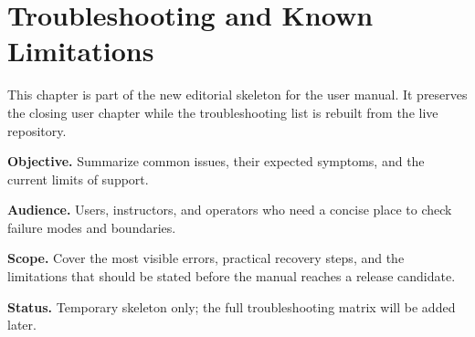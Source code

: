 \chapter{Troubleshooting and Known Limitations}
\label{chap:troubleshooting-and-known-limitations}

This chapter is part of the new editorial skeleton for the user manual. It preserves the closing user chapter while the troubleshooting list is rebuilt from the live repository.

\noindent\textbf{Objective.} Summarize common issues, their expected symptoms, and the current limits of support.

\noindent\textbf{Audience.} Users, instructors, and operators who need a concise place to check failure modes and boundaries.

\noindent\textbf{Scope.} Cover the most visible errors, practical recovery steps, and the limitations that should be stated before the manual reaches a release candidate.

\noindent\textbf{Status.} Temporary skeleton only; the full troubleshooting matrix will be added later.
